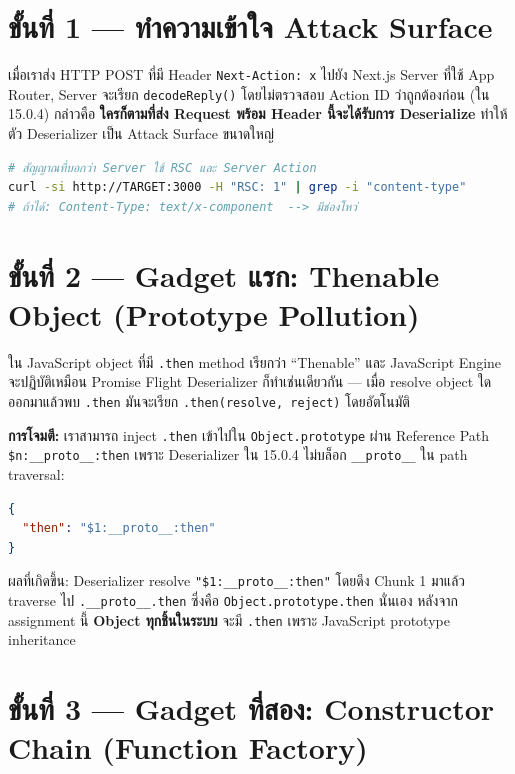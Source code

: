 \documentclass[12pt,oneside]{report}
\begin{document}
\section{ขั้นที่ 1 — ทำความเข้าใจ Attack Surface}

เมื่อเราส่ง HTTP POST ที่มี Header \texttt{Next-Action: x} ไปยัง Next.js Server ที่ใช้ App Router, Server จะเรียก \texttt{decodeReply()} โดยไม่ตรวจสอบ Action ID ว่าถูกต้องก่อน (ใน 15.0.4) กล่าวคือ \textbf{ใครก็ตามที่ส่ง Request พร้อม Header นี้จะได้รับการ Deserialize} ทำให้ตัว Deserializer เป็น Attack Surface ขนาดใหญ่

\begin{lstlisting}[language=bash, caption=การตรวจสอบว่า Server รองรับ Server Action]
# สัญญาณที่บอกว่า Server ใช้ RSC และ Server Action
curl -si http://TARGET:3000 -H "RSC: 1" | grep -i "content-type"
# ถ้าได้: Content-Type: text/x-component  --> มีช่องโหว่
\end{lstlisting}

\section{ขั้นที่ 2 — Gadget แรก: Thenable Object (Prototype Pollution)}

ใน JavaScript object ที่มี \texttt{.then} method เรียกว่า ``Thenable'' และ JavaScript Engine จะปฏิบัติเหมือน Promise Flight Deserializer ก็ทำเช่นเดียวกัน — เมื่อ resolve object ใดออกมาแล้วพบ \texttt{.then} มันจะเรียก \texttt{.then(resolve, reject)} โดยอัตโนมัติ

\textbf{การโจมตี:} เราสามารถ inject \texttt{.then} เข้าไปใน \texttt{Object.prototype} ผ่าน Reference Path \texttt{\$n:\_\_proto\_\_:then} เพราะ Deserializer ใน 15.0.4 ไม่บล็อก \texttt{\_\_proto\_\_} ใน path traversal:

\begin{lstlisting}[language=json, caption=Gadget แรก — inject .then ผ่าน Prototype Pollution]
{
  "then": "$1:__proto__:then"
}
\end{lstlisting}

ผลที่เกิดขึ้น: Deserializer resolve \texttt{"\$1:\_\_proto\_\_:then"} โดยดึง Chunk 1 มาแล้ว traverse ไป \texttt{.\_\_proto\_\_.then} ซึ่งคือ \texttt{Object.prototype.then} นั่นเอง หลังจาก assignment นี้ \textbf{Object ทุกชิ้นในระบบ} จะมี \texttt{.then} เพราะ JavaScript prototype inheritance

\section{ขั้นที่ 3 — Gadget ที่สอง: Constructor Chain (Function Factory)}
\end{document}
